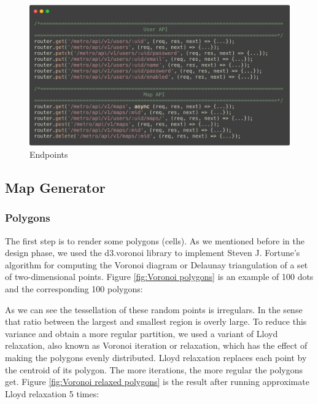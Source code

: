 \begin{figure}[htbp]
  \includegraphics[width=\textwidth]{section04/assets/Endpoints.png}
  \caption{Endpoints}
  \label{fig:Endpoints}
\end{figure}

\subsection{Map Generator}
\subsubsection{Polygons}
The first step is to render some polygons (cells). As we mentioned before in the design phase, we used the d3.voronoi library to implement Steven J. Fortune’s algorithm for computing the Voronoi diagram or Delaunay triangulation of a set of two-dimensional points. Figure \ref{fig:Voronoi polygons} is an example of 100 dots and the corresponding 100 polygons:

As we can see the tessellation of these random points is irregulars. In the sense that ratio between the largest and smallest region is overly large. To reduce this variance and obtain a more regular partition, we used a variant of Lloyd relaxation, also known as Voronoi iteration or relaxation, which has the effect of making the polygons evenly distributed. Lloyd relaxation replaces each point by the centroid of its polygon. The more iterations, the more regular the polygons get. Figure \ref{fig:Voronoi relaxed polygons} is the result after running approximate Lloyd relaxation 5 times:


